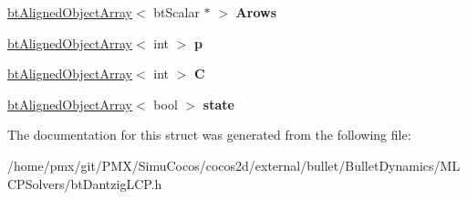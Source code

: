 \begin{DoxyCompactItemize}
\hyperlink{classbtAlignedObjectArray}{bt\+Aligned\+Object\+Array}$<$ bt\+Scalar $\ast$ $>$ {\bfseries Arows}
\item 
\mbox{\label{structbtDantzigScratchMemory_a1164d4f027548d7f56324848286e953f}} 
\hyperlink{classbtAlignedObjectArray}{bt\+Aligned\+Object\+Array}$<$ int $>$ {\bfseries p}
\item 
\mbox{\label{structbtDantzigScratchMemory_ab8026dfcdcbf7c1766869b34b8dcdf36}} 
\hyperlink{classbtAlignedObjectArray}{bt\+Aligned\+Object\+Array}$<$ int $>$ {\bfseries C}
\item 
\mbox{\label{structbtDantzigScratchMemory_aa46ea910af09aa0b32311e74391fe3a8}} 
\hyperlink{classbtAlignedObjectArray}{bt\+Aligned\+Object\+Array}$<$ bool $>$ {\bfseries state}
\end{DoxyCompactItemize}


The documentation for this struct was generated from the following file\+:\begin{DoxyCompactItemize}
\item 
/home/pmx/git/\+P\+M\+X/\+Simu\+Cocos/cocos2d/external/bullet/\+Bullet\+Dynamics/\+M\+L\+C\+P\+Solvers/bt\+Dantzig\+L\+C\+P.\+h\end{DoxyCompactItemize}
